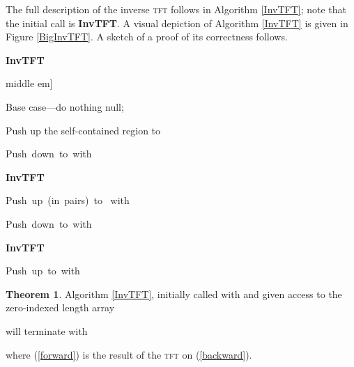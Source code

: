 \documentclass[12pt]{article}
\theoremstyle{definition}
\newcommand{\0}{\mathbf{0}}
\theoremstyle{theorem}
\newtheorem{theorem}{Theorem}
\theoremstyle{definition}
\begin{document}
The full description of the inverse \textsc{tft} follows in Algorithm \ref{InvTFT}; note that the initial call is {\bf InvTFT}. A visual depiction of Algorithm \ref{InvTFT} is given in Figure \ref{BigInvTFT}. A sketch of a proof of its correctness follows.



\newcommand{\head}{\text{head}}
\newcommand{\tail}{\text{tail}}
\newcommand{\last}{\text{last}}
\newcommand{\LM}{\text{LeftMiddle}}
\newcommand{\RM}{\text{RightMiddle}}

\begin{algorithm}

\setlength{\parskip}{0.65ex}

\caption{\textbf{InvTFT}}
\label{InvTFT}




\BlankLine
middle \1em]

\If {\rm } { 
	Base case---do nothing\;
	\Return null;
}


\ElseIf {\rm } {
	Push up the self-contained region  to \;
	
	\mbox{Push down  to  with }~\;
	
	{\bf InvTFT}\;
	\;

	\mbox{Push up (in pairs)  to } 		\mbox{with }~\;
	
	
}
\ElseIf {\rm} {


	\mbox{Push down  to  with }\;
	
	{\bf InvTFT}\;
	
\mbox{Push up  to  with }\;

}



\end{algorithm}
 

\begin{theorem}
Algorithm \ref{InvTFT}, initially called with  and given access to the zero-indexed length  array

will terminate with

where (\ref{forward}) is the result of the \textsc{tft} on (\ref{backward}).
\end{theorem}
\end{document}
